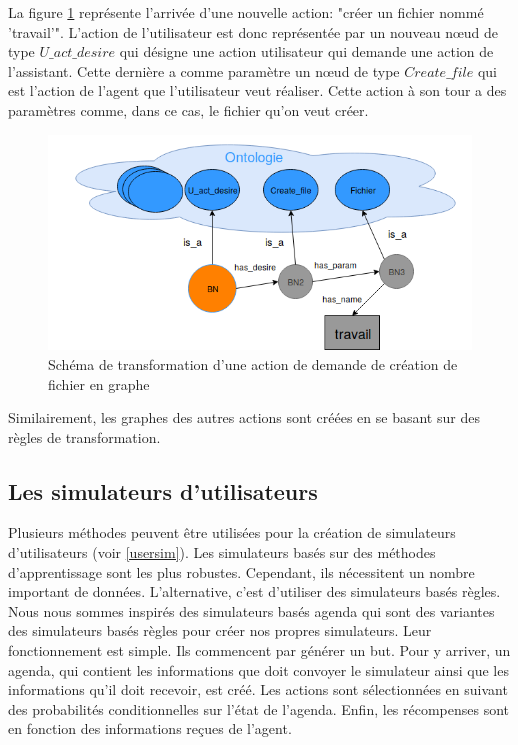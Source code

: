 La figure \ref{nonabstract_onto} représente l'arrivée d'une nouvelle action: "créer un fichier nommé 'travail'". L'action de l'utilisateur est donc représentée par un nouveau n\oe{}ud de type $U\_act\_desire$ qui désigne une action utilisateur qui demande une action de l'assistant. Cette dernière a comme paramètre un n\oe{}ud de type $Create\_file$ qui est l'action de l'agent que l'utilisateur veut réaliser. Cette action à son tour a des paramètres comme, dans ce cas, le fichier qu'on veut créer.
\begin{figure}[H] 
	\centering
	\includegraphics[width=0.88\linewidth]{images/Conception/DM/nonabstract_onto.png}
	\caption{Schéma de transformation d'une action de demande de création de fichier en graphe}\label{nonabstract_onto}
	
\end{figure}
Similairement, les graphes des autres actions sont créées en se basant sur des règles de transformation.
\subsection{Les simulateurs d'utilisateurs}
Plusieurs méthodes peuvent être utilisées pour la création de simulateurs d'utilisateurs (voir \ref{usersim}). Les simulateurs basés sur des méthodes d'apprentissage sont les plus robustes. Cependant, ils nécessitent un nombre important de données. L'alternative, c'est d'utiliser des simulateurs basés règles. Nous nous sommes inspirés des simulateurs basés agenda \citep{Schatzmann2007} qui sont des variantes des simulateurs basés règles pour créer nos propres simulateurs. Leur fonctionnement est simple. Ils commencent par générer un but. Pour y arriver, un agenda, qui contient les informations que doit convoyer le simulateur ainsi que les informations qu'il doit recevoir, est créé. Les actions sont sélectionnées en suivant des probabilités conditionnelles sur l'état de l'agenda. Enfin, les récompenses sont en fonction des informations reçues de l'agent.
